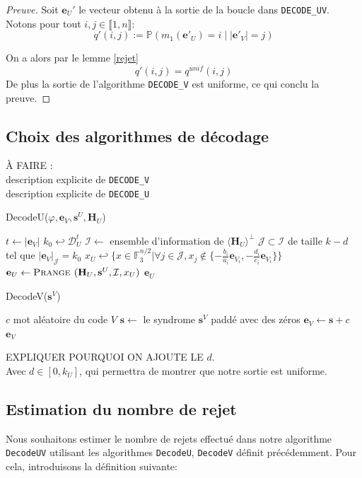 \documentclass[12pt]{article}
\theoremstyle{plain}
\theoremstyle{definition}
\newcommand{\F}{\mathbb{F}}
\newcommand{\e}{\mathbf{e}}
\newcommand{\s}{\mathbf{s}}
\newcommand{\J}{\mathcal{J}}
\begin{document}
\begin{proof}[Preuve]
Soit $\e_U'$ le vecteur obtenu à la sortie de la boucle dans \verb|DECODE_UV|.  Notons pour tout $i,j \in \llbracket 1,n \rrbracket$:
$$q'(i,j) := \mathbb{P}(m_1(\mathbf{e'}_U)=i\;|\;|\mathbf{e'}_V|=j)$$

\noindent On a alors par le lemme \ref{rejet}
$$q'(i,j) = q^{unif}(i,j)$$
De plus la sortie de l'algorithme \verb|DECODE_V| est uniforme, ce qui conclu la preuve.
\end{proof}

\subsection{Choix des algorithmes de décodage}
À FAIRE :\\
description explicite de \verb|DECODE_V| \\
description explicite de \verb|DECODE_U| \\

\begin{algorithm}
	\caption{DecodeU($\varphi, \e_V, \s^U, \mathbf{H}_U$)}
	\begin{algorithmic}[1]
		\STATE $t \leftarrow |\e_V|$
		\STATE $k_0 \hookleftarrow \mathcal{D}_U^t$
		\REPEAT
		\STATE $\mathcal{I} \leftarrow$ ensemble d'information de $\langle\mathbf{H}_U\rangle^\perp$
		\STATE $\mathcal{J} \subset \mathcal{I}$ de taille $k-d$ tel que $|\e_V|_\mathcal{J} = k_0$
		\STATE $x_U \hookleftarrow \{x\in\F_3^{n/2} | \forall j\in\J,  x_j \notin \{-\frac{b_i}{a_i}\e_{V_i}, -\frac{d_i}{c_i}\e_{V_i}\}\}$
		\STATE $\e_U \leftarrow \textsc{Prange }(\mathbf{H}_U, \s^U, \mathcal{I}, x_U)$
		\UNTIL {$|\varphi(\e_U,\e_V)| \neq \omega$}
		\RETURN $\e_U$
    \end{algorithmic}
\end{algorithm}


\begin{algorithm}
	\caption{DecodeV($\s^V$)}
	\begin{algorithmic}[1]
    	\STATE $c$ mot aléatoire du code $V$
    	\STATE $\s \leftarrow$ le syndrome $\s^V$ paddé avec des zéros
    	\STATE $\e_V \leftarrow \s + c$
    	\RETURN $\e_V$
    \end{algorithmic}
\end{algorithm}

EXPLIQUER POURQUOI ON AJOUTE LE $d$.\\
Avec $d\in [0,k_U]$, qui permettra de montrer que notre sortie est uniforme.

\subsection{Estimation du nombre de rejet}
Nous souhaitons estimer le nombre de rejets effectué dans notre algorithme \verb|DecodeUV| utilisant les algorithmes \verb|DecodeU|, \verb|DecodeV| définit précédemment. Pour cela, introduisons la définition suivante:
\end{document}
